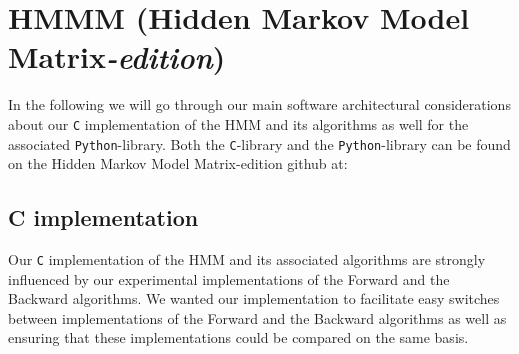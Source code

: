 \section{HMMM (Hidden Markov Model Matrix{\small\textit{-edition}})}\label{sec:hmmmlib}

In the following we will go through our main software architectural considerations about our \texttt{C} implementation of the HMM and its algorithms as well for the associated \texttt{Python}-library. Both the \texttt{C}-library and the \texttt{Python}-library can be found on the Hidden Markov Model Matrix-edition github at: 

\subsection{C implementation}

Our \texttt{C} implementation of the HMM and its associated algorithms are strongly influenced by our experimental implementations of the Forward and the Backward algorithms. We wanted our implementation to facilitate easy switches between implementations of the Forward and the Backward algorithms as well as ensuring that these implementations could be compared on the same basis.

